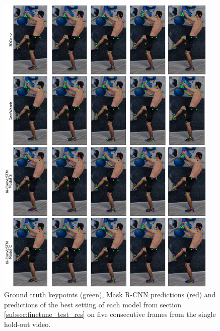 \documentclass[./main.tex]{subfiles}
\begin{document}
\begin{figure}[h]
    \centering
    \includegraphics[width=0.95\textwidth]{./entities/predictions.png}
    \caption{Ground truth keypoints (green), Mask R-CNN predictions (red) and predictions of the best setting of each model from section \ref{subsec:finetune_test_res} on five consecutive frames from the single hold-out video.}
    \label{fig:predictions}
\end{figure}
\end{document}
